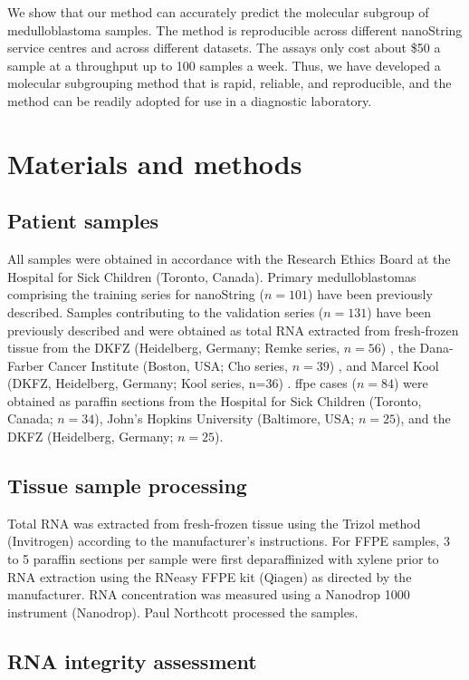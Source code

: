 We show that our method can accurately predict the molecular subgroup of medulloblastoma samples. The method is reproducible across different nanoString service centres and across different datasets. The assays only cost about \$50 a sample at a throughput up to 100 samples a week. Thus, we have developed a molecular subgrouping method that is rapid, reliable, and reproducible, and the method can be readily adopted for use in a diagnostic laboratory.


\section{Materials and methods}

\subsection{Patient samples}

All samples were obtained in accordance with the Research Ethics Board at the Hospital for Sick Children (Toronto, Canada).  Primary medulloblastomas comprising the training series for nanoString ($n = 101$) have been previously described.  Samples contributing to the validation series ($n = 131$) have been previously described and were obtained as total RNA extracted from fresh-frozen tissue from the DKFZ (Heidelberg, Germany; Remke series, $n = 56$) , the Dana-Farber Cancer Institute (Boston, USA; Cho series, $n = 39$) , and Marcel Kool (DKFZ, Heidelberg, Germany; Kool series, n=36) .  \gls{ffpe} cases ($n = 84$) were obtained as paraffin sections from the Hospital for Sick Children (Toronto, Canada; $n = 34$), John’s Hopkins University (Baltimore, USA; $n = 25$), and the DKFZ (Heidelberg, Germany; $n = 25$).

\subsection{Tissue sample processing}

Total RNA was extracted from fresh-frozen tissue using the Trizol method (Invitrogen) according to the manufacturer’s instructions.  For FFPE samples, 3 to 5 paraffin sections per sample were first deparaffinized with xylene prior to RNA extraction using the RNeasy FFPE kit (Qiagen) as directed by the manufacturer.  RNA concentration was measured using a Nanodrop 1000 instrument (Nanodrop). Paul Northcott processed the samples.

\subsection{RNA integrity assessment}

